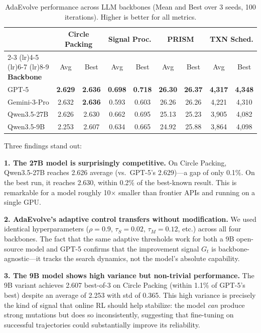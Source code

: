 \documentclass{article}
\begin{document}
\begin{table}[h]
  \centering
  \small
  \setlength{\tabcolsep}{3.5pt}
  \renewcommand{\arraystretch}{1.15}
  \begin{tabular}{l cc cc cc cc}
  \toprule
  & \multicolumn{2}{c}{\textbf{Circle Packing}}
  & \multicolumn{2}{c}{\textbf{Signal Proc.}}
  & \multicolumn{2}{c}{\textbf{PRISM}}
  & \multicolumn{2}{c}{\textbf{TXN Sched.}} \\
  \cmidrule(lr){2-3}
  \cmidrule(lr){4-5}
  \cmidrule(lr){6-7}
  \cmidrule(lr){8-9}
  \textbf{Backbone}
  & Avg & Best
  & Avg & Best
  & Avg & Best
  & Avg & Best \\
  \midrule
  GPT-5        & \textbf{2.629} & \textbf{2.636} & \textbf{0.698} & \textbf{0.718} & \textbf{26.30} & \textbf{26.37} & \textbf{4,317} & \textbf{4,348} \\
  Gemini-3-Pro & 2.632 & \textbf{2.636} & 0.593 & 0.603 & 26.26 & 26.26 & 4,221 & 4,310 \\
  Qwen3.5-27B  & 2.626 & 2.630 & 0.662 & 0.695 & 25.13 & 25.23 & 3,905 & 4,082 \\
  Qwen3.5-9B   & 2.253 & 2.607 & 0.634 & 0.665 & 24.92 & 25.88 & 3,864 & 4,098 \\
  \bottomrule
  \end{tabular}
  \caption{AdaEvolve performance across LLM backbones (Mean and Best over 3 seeds, 100 iterations). Higher is better for all metrics.}
  \label{tab:backbone}
\end{table}

Three findings stand out:

\textbf{1. The 27B model is surprisingly competitive.} On Circle Packing, Qwen3.5-27B reaches 2.626 average (vs.\ GPT-5's 2.629)---a gap of only 0.1\%. On the best run, it reaches 2.630, within 0.2\% of the best-known result. This is remarkable for a model roughly 10$\times$ smaller than frontier APIs and running on a single GPU.

\textbf{2. AdaEvolve's adaptive control transfers without modification.} We used identical hyperparameters ($\rho=0.9$, $\tau_S=0.02$, $\tau_M=0.12$, etc.) across all four backbones. The fact that the same adaptive thresholds work for both a 9B open-source model and GPT-5 confirms that the improvement signal $G_t$ is backbone-agnostic---it tracks the search dynamics, not the model's absolute capability.

\textbf{3. The 9B model shows high variance but non-trivial performance.} The 9B variant achieves 2.607 best-of-3 on Circle Packing (within 1.1\% of GPT-5's best) despite an average of 2.253 with std of 0.365. This high variance is precisely the kind of signal that online RL should help stabilize: the model \emph{can} produce strong mutations but does so inconsistently, suggesting that fine-tuning on successful trajectories could substantially improve its reliability.
\end{document}
